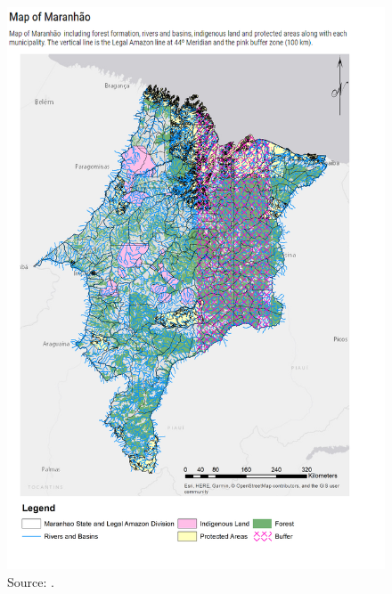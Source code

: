 \begin{figure}[H]
  \centering
  \includegraphics[width=1\textwidth, inner]{buffer_veg21.png}
\caption{Source: \citep{MMMAwebsite,nugeo_2018,embrapa_2018}.}
\label{fig:buffer}
\end{figure}



